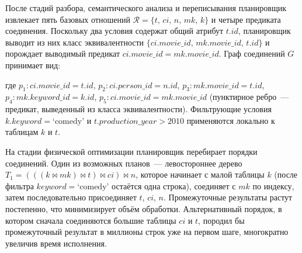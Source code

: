 После стадий разбора, семантического анализа и переписывания
планировщик извлекает пять базовых отношений
$\mathcal{R} = \{t,\, ci,\, n,\, mk,\, k\}$
и четыре предиката соединения. Поскольку два условия содержат общий атрибут $t.\mathit{id}$, 
планировщик выводит из них
класс эквивалентности $\{ci.\mathit{movie\_id},\, mk.\mathit{movie\_id},\,
t.\mathit{id}\}$ и порождает выводимый предикат
$ci.\mathit{movie\_id} = mk.\mathit{movie\_id}$.
Граф соединений $G$ принимает вид:

\begin{center}
\end{center}

\noindent
где $p_1\colon ci.\mathit{movie\_id} = t.\mathit{id}$,\;
$p_2\colon ci.\mathit{person\_id} = n.\mathit{id}$,\;
$p_3\colon mk.\mathit{movie\_id} = t.\mathit{id}$,\;
$p_4\colon mk.\mathit{keyword\_id} = k.\mathit{id}$,\;
$p_5\colon ci.\mathit{movie\_id} = mk.\mathit{movie\_id}$
(пунктирное ребро~--- предикат, выведенный из класса эквивалентности).
Фильтрующие условия $k.\mathit{keyword} = \text{`comedy'}$ и
$t.\mathit{production\_year} > 2010$ применяются локально к таблицам $k$ и $t$.
\par

На стадии физической оптимизации планировщик перебирает порядки соединений.
Один из возможных планов~--- левостороннее дерево
$T_1 = (((k \Join mk) \Join t) \Join ci) \Join n$,
которое начинает с малой таблицы $k$ (после фильтра
$\mathit{keyword} = \text{`comedy'}$ остаётся одна строка),
соединяет с $mk$ по индексу, затем последовательно присоединяет $t$, $ci$, $n$.
Промежуточные результаты растут постепенно, что минимизирует объём обработки.
Альтернативный порядок, в котором сначала соединяются большие таблицы
$ci$ и $t$,
породил бы промежуточный результат в миллионы строк уже на первом шаге,
многократно увеличив время исполнения.
\par

